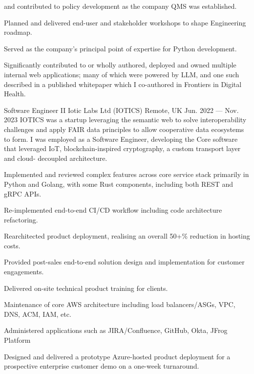 \begin{cventries}
{\begin{cvitems}
{          and contributed to policy development as the company QMS was established.
        }
        \item{
          Planned and delivered end-user and stakeholder workshops to shape Engineering roadmap.
        }
        \item{
          Served as the company’s principal point of expertise for Python development.
        }
        \item{
          Significantly contributed to or wholly authored, deployed and owned multiple internal web
          applications; many of which were powered by LLM, and one such described in a published
          whitepaper which I co-authored in Frontiers in Digital Health.
        }
      \end{cvitems}
  }
  \cventry
    {Software Engineer II}
    {Iotic Labs Ltd (IOTICS)}
    {Remote, UK}
    {Jun. 2022 --- Nov. 2023}
    IOTICS was a startup leveraging the semantic web to solve interoperability challenges and apply FAIR data
    principles to allow cooperative data ecosystems to form. I was employed as a Software Engineer, developing
    the Core software that leveraged IoT, blockchain-inspired cryptography, a custom transport layer and cloud-
    decoupled architecture.
    {
      \begin{cvitems}
      \item{Implemented and reviewed complex features across core service stack primarily in Python and Golang, with some Rust components, including both REST and gRPC APIs.}
      \item{Re-implemented end-to-end CI/CD workflow including code architecture refactoring.}
      \item{Rearchitected product deployment, realising an overall 50+\% reduction in hosting costs.}
      \item{Provided post-sales end-to-end solution design and implementation for customer engagements.}
      \item{Delivered on-site technical product training for clients.}
      \item{Maintenance of core AWS architecture including load balancers/ASGs, VPC, DNS, ACM, IAM, etc.}
      \item{Administered applications such as JIRA/Confluence, GitHub, Okta, JFrog Platform}
      \item{Designed and delivered a prototype Azure-hosted product deployment for a prospective enterprise customer demo on a one-week turnaround.}
      \end{cvitems}
}
\end{cventries}
